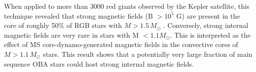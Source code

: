 When applied to more than 3000 red giants observed by the Kepler satellite, this technique revealed that strong magnetic fields (B $> 10^5$ G) are present in the core of roughly 50\% of RGB stars with $M \! > \! 1.5 \, M_\odot$ \citep{Stello_2016,Stello_2016a}. Conversely, strong internal magnetic fields are very rare in stars with M $< 1.1M_\odot$. This is interpreted as the effect of MS core-dynamo-generated magnetic fields in the convective cores of $M \! > \! 1.1 \, M_\odot$ stars. This result shows that a potentially very large fraction of main sequence OBA stars could host strong internal magnetic fields.



